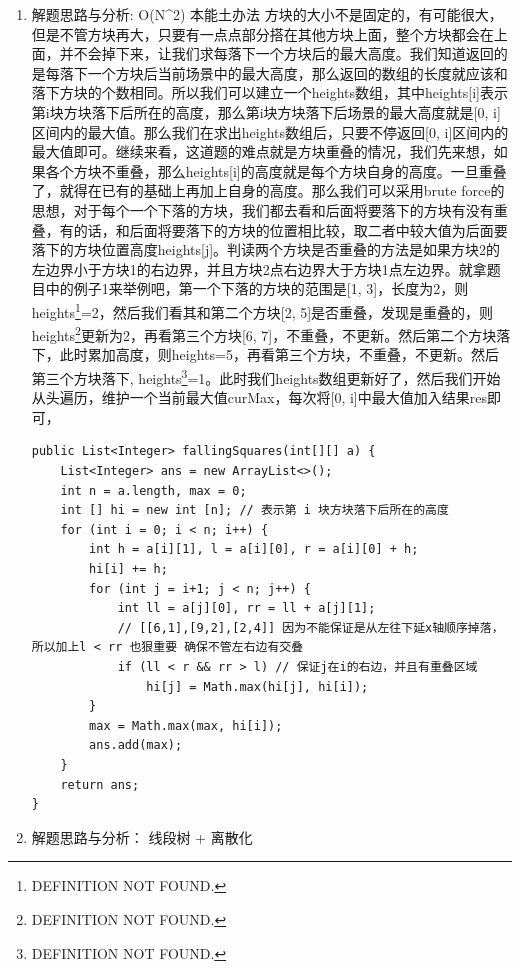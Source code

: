 \documentclass[9pt, b5paaper]{book}
\begin{document}
\begin{enumerate}
\item 解题思路与分析: O(N\^{}2) 本能土办法
\label{sec-1-0-5-1}
方块的大小不是固定的，有可能很大，但是不管方块再大，只要有一点点部分搭在其他方块上面，整个方块都会在上面，并不会掉下来，让我们求每落下一个方块后的最大高度。我们知道返回的是每落下一个方块后当前场景中的最大高度，那么返回的数组的长度就应该和落下方块的个数相同。所以我们可以建立一个heights数组，其中heights[i]表示第i块方块落下后所在的高度，那么第i块方块落下后场景的最大高度就是[0, i]区间内的最大值。那么我们在求出heights数组后，只要不停返回[0, i]区间内的最大值即可。继续来看，这道题的难点就是方块重叠的情况，我们先来想，如果各个方块不重叠，那么heights[i]的高度就是每个方块自身的高度。一旦重叠了，就得在已有的基础上再加上自身的高度。那么我们可以采用brute force的思想，对于每个一个下落的方块，我们都去看和后面将要落下的方块有没有重叠，有的话，和后面将要落下的方块的位置相比较，取二者中较大值为后面要落下的方块位置高度heights[j]。判读两个方块是否重叠的方法是如果方块2的左边界小于方块1的右边界，并且方块2点右边界大于方块1点左边界。就拿题目中的例子1来举例吧，第一个下落的方块的范围是[1, 3]，长度为2，则heights\footnote{DEFINITION NOT FOUND.}=2，然后我们看其和第二个方块[2, 5]是否重叠，发现是重叠的，则heights\footnote{DEFINITION NOT FOUND.}更新为2，再看第三个方块[6, 7]，不重叠，不更新。然后第二个方块落下，此时累加高度，则heights\footnotemark[2]{}=5，再看第三个方块，不重叠，不更新。然后第三个方块落下, heights\footnote{DEFINITION NOT FOUND.}=1。此时我们heights数组更新好了，然后我们开始从头遍历，维护一个当前最大值curMax，每次将[0, i]中最大值加入结果res即可，
\begin{verbatim}
public List<Integer> fallingSquares(int[][] a) {
    List<Integer> ans = new ArrayList<>();
    int n = a.length, max = 0;
    int [] hi = new int [n]; // 表示第 i 块方块落下后所在的高度
    for (int i = 0; i < n; i++) {
        int h = a[i][1], l = a[i][0], r = a[i][0] + h;
        hi[i] += h;
        for (int j = i+1; j < n; j++) {
            int ll = a[j][0], rr = ll + a[j][1];
            // [[6,1],[9,2],[2,4]] 因为不能保证是从左往下延x轴顺序掉落，所以加上l < rr 也狠重要 确保不管左右边有交叠
            if (ll < r && rr > l) // 保证j在i的右边，并且有重叠区域
                hi[j] = Math.max(hi[j], hi[i]);
        }
        max = Math.max(max, hi[i]);
        ans.add(max);
    }
    return ans;
}
\end{verbatim}
\item 解题思路与分析： 线段树 + 离散化
\label{sec-1-0-5-2}


\end{enumerate}
\end{document}
